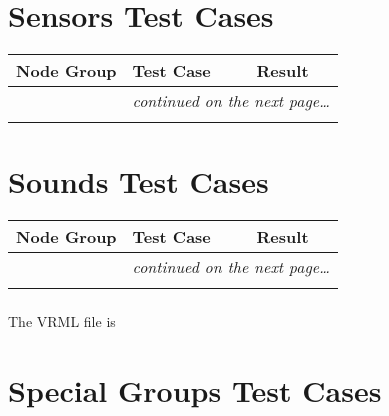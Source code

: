 \documentclass[12pt,letterpaper]{article}
\newcounter{testCaseCtr}
\newcommand{\resetTestCase}{\setcounter{testCaseCtr}{1}}
\begin{document}
\section{Sensors Test Cases}
\resetTestCase

\begin{center}
\setlongtables
\begin{longtable}{|l|l|l|}
\hline
\textbf{Node Group} & \textbf{Test Case} & \textbf{Result} \\
\hline\hline
\endhead
 & \multicolumn{2}{|r|}{\textsl{continued on the next page\ldots}} \\
\hline
\endfoot
\hline
\endlastfoot
& & \\
\cline{2-3}
\end{longtable}
\end{center}

\section{Sounds Test Cases}
\resetTestCase

\begin{center}
\setlongtables
\begin{longtable}{|l|l|l|}
\hline
\textbf{Node Group} & \textbf{Test Case} & \textbf{Result} \\
\hline\hline
\endhead
 & \multicolumn{2}{|r|}{\textsl{continued on the next page\ldots}} \\
\hline
\endfoot
\hline
\endlastfoot
& & \\
\cline{2-3}
\end{longtable}
\end{center}

\subsubsection{}
The VRML file is 

\section{Special Groups Test Cases}
\resetTestCase
\end{document}
